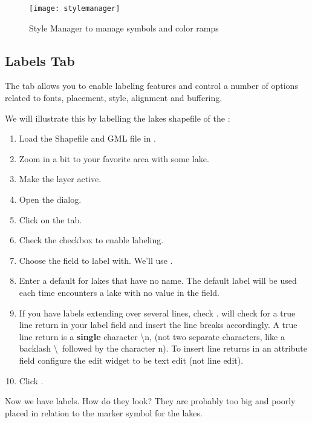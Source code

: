 \begin{figure}[ht]
   \centering
   \texttt{[image: stylemanager]}
   \caption{Style Manager to manage symbols and color ramps \nixcaption}\label{fig:stylemanager}
\end{figure}

\subsection{Labels Tab}\label{labeltab}

The  tab allows you to enable labeling features and control a number of
options related to fonts, placement, style, alignment and buffering.

We will illustrate this by labelling the lakes shapefile of the
:

\begin{enumerate}
\item Load the Shapefile  and GML file  in \qg.
\item Zoom in a bit to your favorite area with some lake.
\item Make the  layer active.
\item Open the  dialog.
\item Click on the  tab.
\item Check the  checkbox to enable labeling.
\item Choose the field to label with.
  We'll use .
\item Enter a default for lakes that have no name. The default label will be
  used each time \qg encounters a lake with no value in the 
field.
\item If you have labels extending over several lines, check . \qg will check for a true line return in your label field and
insert the line breaks accordingly. A true line return is a \textbf{single}
character \textbackslash n, (not two separate characters, like a backlash
\textbackslash ~followed by the character n).  To insert line returns in an
attribute field configure the edit widget to be text edit (not line edit).
\item Click .
\end{enumerate}

Now we have labels. How do they look? They are probably too big and poorly
placed in relation to the marker symbol for the lakes.

